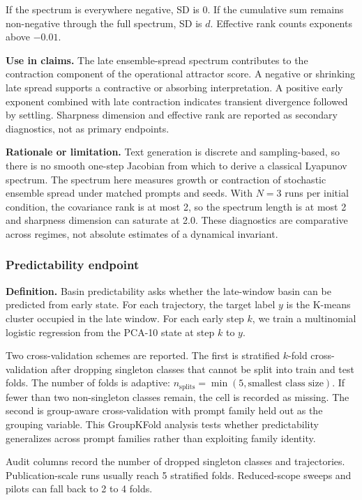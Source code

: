 \documentclass{article}
\theoremstyle{plain}
\theoremstyle{definition}
\begin{document}
If the spectrum is everywhere negative, SD is 0. If the cumulative sum remains non-negative through the full spectrum, SD is \(d\). Effective rank counts exponents above \(-0.01\).

\textbf{Use in claims.} The late ensemble-spread spectrum contributes to the contraction component of the operational attractor score. A negative or shrinking late spread supports a contractive or absorbing interpretation. A positive early exponent combined with late contraction indicates transient divergence followed by settling. Sharpness dimension and effective rank are reported as secondary diagnostics, not as primary endpoints.

\textbf{Rationale or limitation.} Text generation is discrete and sampling-based, so there is no smooth one-step Jacobian from which to derive a classical Lyapunov spectrum. The spectrum here measures growth or contraction of stochastic ensemble spread under matched prompts and seeds. With \(N=3\) runs per initial condition, the covariance rank is at most 2, so the spectrum length is at most 2 and sharpness dimension can saturate at 2.0. These diagnostics are comparative across regimes, not absolute estimates of a dynamical invariant.

\subsubsection{Predictability endpoint}

\textbf{Definition.} Basin predictability asks whether the late-window basin can be predicted from early state. For each trajectory, the target label \(y\) is the K-means cluster occupied in the late window. For each early step \(k\), we train a multinomial logistic regression from the PCA-10 state at step \(k\) to \(y\).

Two cross-validation schemes are reported. The first is stratified \(k\)-fold cross-validation after dropping singleton classes that cannot be split into train and test folds. The number of folds is adaptive: \(n_{\mathrm{splits}}=\min(5,\text{smallest class size})\). If fewer than two non-singleton classes remain, the cell is recorded as missing. The second is group-aware cross-validation with prompt family held out as the grouping variable. This GroupKFold analysis tests whether predictability generalizes across prompt families rather than exploiting family identity.

Audit columns record the number of dropped singleton classes and trajectories. Publication-scale runs usually reach 5 stratified folds. Reduced-scope sweeps and pilots can fall back to 2 to 4 folds.
\end{document}
